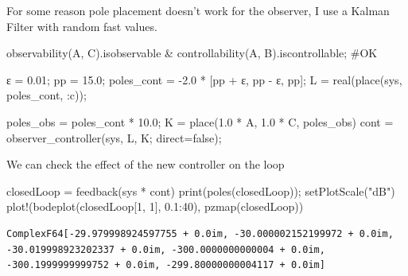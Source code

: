 \documentclass[
  8pt,
  a4paper,
]{book}
\newenvironment{Shaded}{\begin{snugshade}}{\end{snugshade}}
\newcommand{\CharTok}[1]{\textcolor[rgb]{0.13,0.47,0.30}{#1}}
\newcommand{\CommentTok}[1]{\textcolor[rgb]{0.37,0.37,0.37}{#1}}
\newcommand{\ConstantTok}[1]{\textcolor[rgb]{0.56,0.35,0.01}{#1}}
\newcommand{\FloatTok}[1]{\textcolor[rgb]{0.68,0.00,0.00}{#1}}
\newcommand{\FunctionTok}[1]{\textcolor[rgb]{0.28,0.35,0.67}{#1}}
\newcommand{\NormalTok}[1]{\textcolor[rgb]{0.00,0.23,0.31}{#1}}
\newcommand{\OperatorTok}[1]{\textcolor[rgb]{0.37,0.37,0.37}{#1}}
\newcommand{\StringTok}[1]{\textcolor[rgb]{0.13,0.47,0.30}{#1}}
\begin{document}
For some reason pole placement doesn't work for the observer, I use a
Kalman Filter with random fast values.

\begin{Shaded}
\begin{Highlighting}[]
\FunctionTok{observability}\NormalTok{(A, C).isobservable }\OperatorTok{\&} 
\FunctionTok{controllability}\NormalTok{(A, B).iscontrollable; }\CommentTok{\#OK}

\NormalTok{ε }\OperatorTok{=} \FloatTok{0.01}\NormalTok{;}
\NormalTok{pp }\OperatorTok{=} \FloatTok{15.0}\NormalTok{;}
\NormalTok{poles\_cont }\OperatorTok{=} \OperatorTok{{-}}\FloatTok{2.0} \OperatorTok{*}\NormalTok{ [pp }\OperatorTok{+}\NormalTok{ ε, pp }\OperatorTok{{-}}\NormalTok{ ε, pp];}
\NormalTok{L }\OperatorTok{=} \FunctionTok{real}\NormalTok{(}\FunctionTok{place}\NormalTok{(sys, poles\_cont, }\OperatorTok{:}\NormalTok{c));}

\NormalTok{poles\_obs }\OperatorTok{=}\NormalTok{ poles\_cont }\OperatorTok{*} \FloatTok{10.0}\NormalTok{;}
\NormalTok{K }\OperatorTok{=} \FunctionTok{place}\NormalTok{(}\FloatTok{1.0} \OperatorTok{*}\NormalTok{ A}\OperatorTok{\textquotesingle{}}\NormalTok{, }\FloatTok{1.0} \OperatorTok{*}\NormalTok{ C}\OperatorTok{\textquotesingle{}}\NormalTok{, poles\_obs)}\CharTok{\textquotesingle{}}
\NormalTok{cont }\OperatorTok{=} \FunctionTok{observer\_controller}\NormalTok{(sys, L, K; direct}\OperatorTok{=}\ConstantTok{false}\NormalTok{);}
\end{Highlighting}
\end{Shaded}

We can check the effect of the new controller on the loop

\begin{Shaded}
\begin{Highlighting}[]
\NormalTok{closedLoop }\OperatorTok{=} \FunctionTok{feedback}\NormalTok{(sys }\OperatorTok{*}\NormalTok{ cont)}
\FunctionTok{print}\NormalTok{(}\FunctionTok{poles}\NormalTok{(closedLoop));}
\FunctionTok{setPlotScale}\NormalTok{(}\StringTok{"dB"}\NormalTok{)}
\FunctionTok{plot!}\NormalTok{(}\FunctionTok{bodeplot}\NormalTok{(closedLoop[}\FloatTok{1}\NormalTok{, }\FloatTok{1}\NormalTok{], }\FloatTok{0.1}\OperatorTok{:}\FloatTok{40}\NormalTok{), }\FunctionTok{pzmap}\NormalTok{(closedLoop))}
\end{Highlighting}
\end{Shaded}

\begin{verbatim}
ComplexF64[-29.979998924597755 + 0.0im, -30.000002152199972 + 0.0im, -30.019998923202337 + 0.0im, -300.0000000000004 + 0.0im, -300.1999999999752 + 0.0im, -299.80000000004117 + 0.0im]
\end{verbatim}
\end{document}
